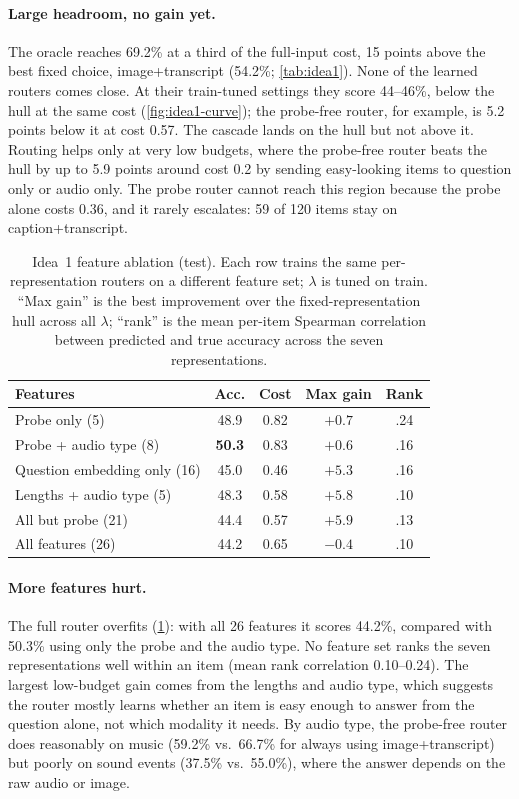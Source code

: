 \documentclass{article}
\begin{document}
\paragraph{Large headroom, no gain yet.} The oracle reaches 69.2\% at a third of
the full-input cost, 15 points above the best fixed choice, image+transcript
(54.2\%; \cref{tab:idea1}). None of the learned routers comes close. At their
train-tuned settings they score 44--46\%, below the hull at the same cost
(\cref{fig:idea1-curve}); the probe-free router, for example, is 5.2 points below it
at cost 0.57. The cascade lands on the hull but not above it. Routing helps only at
very low budgets, where the probe-free router beats the hull by up to 5.9 points
around cost 0.2 by sending easy-looking items to question only or audio only. The
probe router cannot reach this region because the probe alone costs 0.36, and it
rarely escalates: 59 of 120 items stay on caption+transcript.

\begin{table}[t]
\caption{Idea~1 feature ablation (test). Each row trains the same per-representation
routers on a different feature set; $\lambda$ is tuned on train. ``Max gain'' is the
best improvement over the fixed-representation hull across all $\lambda$; ``rank''
is the mean per-item Spearman correlation between predicted and true accuracy across
the seven representations.}
\label{tab:idea1-ablation}
\centering\small
\setlength{\tabcolsep}{3pt}
\begin{tabular}{lcccc}
\toprule
Features & Acc. & Cost & Max gain & Rank \\
\midrule
Probe only (5)                    & 48.9 & 0.82 & $+0.7$ & .24 \\
Probe + audio type (8)            & \textbf{50.3} & 0.83 & $+0.6$ & .16 \\
Question embedding only (16)      & 45.0 & 0.46 & $+5.3$ & .16 \\
Lengths + audio type (5)          & 48.3 & 0.58 & $+5.8$ & .10 \\
All but probe (21)                & 44.4 & 0.57 & $+5.9$ & .13 \\
All features (26)                 & 44.2 & 0.65 & $-0.4$ & .10 \\
\bottomrule
\end{tabular}
\end{table}

\paragraph{More features hurt.} The full router overfits (\cref{tab:idea1-ablation}):
with all 26 features it scores 44.2\%, compared with 50.3\% using only the probe and
the audio type. No feature set ranks the seven representations well within an item
(mean rank correlation 0.10--0.24). The largest low-budget gain comes from the
lengths and audio type, which suggests the router mostly learns whether an item is
easy enough to answer from the question alone, not which modality it needs. By
audio type, the probe-free router does reasonably on music (59.2\% vs.\ 66.7\% for
always using image+transcript) but poorly on sound events (37.5\% vs.\ 55.0\%), where
the answer depends on the raw audio or image.
\end{document}

